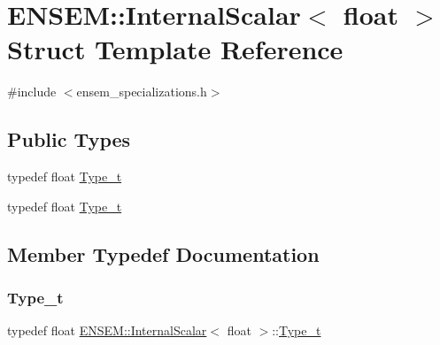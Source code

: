\hypertarget{structENSEM_1_1InternalScalar_3_01float_01_4}{}\section{E\+N\+S\+EM\+:\+:Internal\+Scalar$<$ float $>$ Struct Template Reference}
\label{structENSEM_1_1InternalScalar_3_01float_01_4}


{\ttfamily \#include $<$ensem\+\_\+specializations.\+h$>$}

\subsection*{Public Types}
\begin{DoxyCompactItemize}
\item 
typedef float \mbox{\hyperlink{structENSEM_1_1InternalScalar_3_01float_01_4_a0302b6aa9102572c13ac0b2874a380f0}{Type\+\_\+t}}
\item 
typedef float \mbox{\hyperlink{structENSEM_1_1InternalScalar_3_01float_01_4_a0302b6aa9102572c13ac0b2874a380f0}{Type\+\_\+t}}
\end{DoxyCompactItemize}


\subsection{Member Typedef Documentation}
\mbox{\label{structENSEM_1_1InternalScalar_3_01float_01_4_a0302b6aa9102572c13ac0b2874a380f0}} 
\subsubsection{\texorpdfstring{Type\_t}{Type\_t}\hspace{0.1cm}{\footnotesize\ttfamily [1/2]}}
{\footnotesize\ttfamily typedef float \mbox{\hyperlink{structENSEM_1_1InternalScalar}{E\+N\+S\+E\+M\+::\+Internal\+Scalar}}$<$ float $>$\+::\mbox{\hyperlink{structENSEM_1_1InternalScalar_3_01float_01_4_a0302b6aa9102572c13ac0b2874a380f0}{Type\+\_\+t}}}

\mbox{\label{structENSEM_1_1InternalScalar_3_01float_01_4_a0302b6aa9102572c13ac0b2874a380f0}} 
